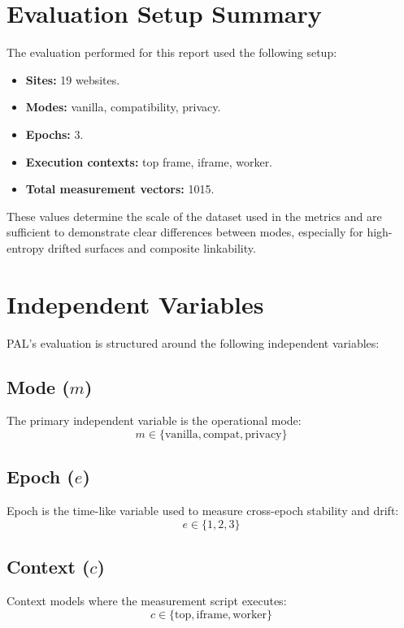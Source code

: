 \documentclass[11pt]{report}
\begin{document}
\section{Evaluation Setup Summary}

The evaluation performed for this report used the following setup:

\begin{itemize}
    \item \textbf{Sites:} 19 websites.
    \item \textbf{Modes:} vanilla, compatibility, privacy.
    \item \textbf{Epochs:} 3.
    \item \textbf{Execution contexts:} top frame, iframe, worker.
    \item \textbf{Total measurement vectors:} 1015.
\end{itemize}

These values determine the scale of the dataset used in the metrics and are sufficient to demonstrate clear differences between modes, especially for high-entropy drifted surfaces and composite linkability.

\section{Independent Variables}

PAL’s evaluation is structured around the following independent variables:

\subsection{Mode ($m$)}

The primary independent variable is the operational mode:
\[
m \in \{\text{vanilla},\text{compat},\text{privacy}\}
\]

\subsection{Epoch ($e$)}

Epoch is the time-like variable used to measure cross-epoch stability and drift:
\[
e \in \{1,2,3\}
\]

\subsection{Context ($c$)}

Context models where the measurement script executes:
\[
c \in \{\text{top},\text{iframe},\text{worker}\}
\]
\end{document}
